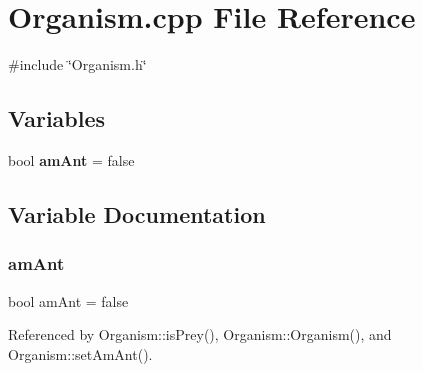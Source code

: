 \section{Organism.\+cpp File Reference}
\label{Organism_8cpp}
{\ttfamily \#include \char`\"{}Organism.\+h\char`\"{}}\newline
\subsection*{Variables}
\begin{DoxyCompactItemize}
\item 
bool \textbf{ am\+Ant} = false
\end{DoxyCompactItemize}


\subsection{Variable Documentation}
\mbox{\label{Organism_8cpp_a900bc6f8ceeedef124e764e3c72b1735}} 
\subsubsection{am\+Ant}
{\footnotesize\ttfamily bool am\+Ant = false}



Referenced by Organism\+::is\+Prey(), Organism\+::\+Organism(), and Organism\+::set\+Am\+Ant().


